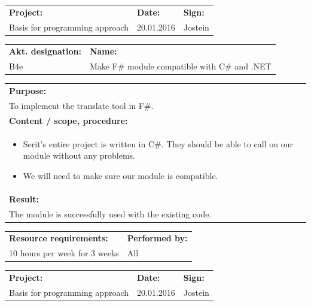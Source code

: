 \documentclass[12pt, a4paper]{article}
\begin{document}
\begin{tabularx}{\textwidth}{|X|p{32mm}|p{20mm}|}
	\hline
	\textbf{Project:}&\textbf{Date:}&\textbf{Sign:}\\
	Basis for programming approach&20.01.2016&Jostein\\
	\hline
\end{tabularx}

\begin{tabularx}{\textwidth}{|p{40mm}|X|}
	\textbf{Akt. designation:}&\textbf{Name:}\\
	B4e&Make F\# module compatible with C\# and .NET \\
	\hline
\end{tabularx}

\begin{tabularx}{\textwidth}{|X|}
	\textbf{Purpose:}\\
	To implement the translate tool in F\#.\\
	\hline
	\textbf{Content / scope, procedure:}\\
	\begin{itemize}
		\item Serit’s entire project is written in C\#. They should be able to call on our module without any problems.
		\item We will need to make sure our module is compatible. 
	\end{itemize}\\
 	\hline
	\textbf{Result:}\\
	The module is successfully used with the existing code. \\
	\hline
\end{tabularx}

\begin{tabularx}{\textwidth}{|X|p{30mm}|}
	\textbf{Resource requirements:}&\textbf{Performed by:}\\
	10 hours per week for 3 weeks
&All\\
	\hline
\end{tabularx}

\newpage

\begin{tabularx}{\textwidth}{|X|p{32mm}|p{20mm}|}
	\hline
	\textbf{Project:}&\textbf{Date:}&\textbf{Sign:}\\
	Basis for programming approach&20.01.2016&Jostein\\
	\hline
\end{tabularx}
\end{document}

